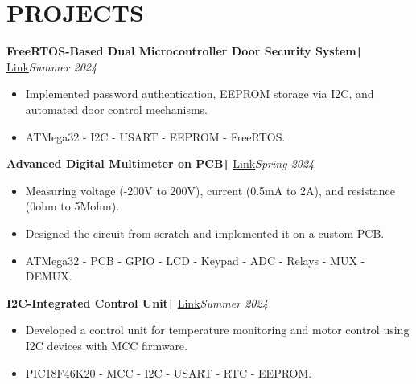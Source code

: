 \documentclass[11pt,a4paper]{article}
\begin{document}
\section*{\fontsize{14}{18}\textbf\selectfont PROJECTS}
\vspace{-0.3cm}
\begin{flushleft}
\textbf{FreeRTOS-Based Dual Microcontroller Door Security System}\texttt{|} {\href{https://www.linkedin.com/feed/update/urn:li:activity:7261751302018244608/}{Link}}\hfill\textit{Summer 2024}\\
\end{flushleft}
\vspace{-0.7cm}
\begin{itemize}
\item \setlength{\itemsep}{-0.0em} Implemented password authentication, EEPROM storage via I2C, and automated door control mechanisms.
\item \setlength{\itemsep}{-0.0em} ATMega32 - I2C - USART - EEPROM - FreeRTOS.
\end{itemize}
\vspace{-0.5cm}
\begin{flushleft}
\textbf{Advanced Digital Multimeter on PCB}\texttt{|} {\href{https://www.linkedin.com/feed/update/urn:li:activity:7227981461818138624/}{Link}}\hfill\textit{Spring 2024}\\
\end{flushleft}
\vspace{-0.7cm}
\begin{itemize}
\item \setlength{\itemsep}{-0.0em} Measuring voltage (-200V to 200V), current (0.5mA to 2A), and resistance (0ohm to 5Mohm).
\item \setlength{\itemsep}{-0.0em} Designed the circuit from scratch and implemented it on a custom PCB.
\item \setlength{\itemsep}{-0.0em} ATMega32 - PCB - GPIO - LCD - Keypad - ADC - Relays - MUX - DEMUX.
\end{itemize}
\vspace{-0.5cm}
\begin{flushleft}
\textbf{I2C-Integrated Control Unit}\texttt{|} {\href{https://www.linkedin.com/feed/update/urn:li:activity:7243602012020330497/}{Link}}\hfill\textit{Summer 2024}\\
\end{flushleft}
\vspace{-0.7cm}
\begin{itemize}
\item \setlength{\itemsep}{-0.0em} Developed a control unit for temperature monitoring and motor control using I2C devices with MCC firmware.
\item \setlength{\itemsep}{-0.0em} PIC18F46K20 - MCC - I2C - USART - RTC - EEPROM.
\end{itemize}
\end{document}

